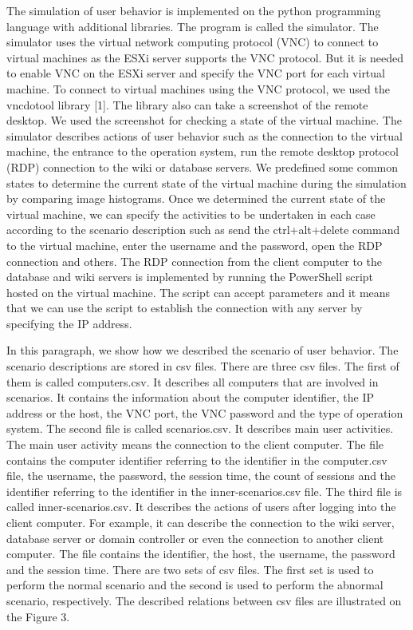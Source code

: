 The simulation of user behavior is implemented on the python programming language with additional libraries. The program is called the simulator. The simulator uses the virtual network computing protocol (VNC) to connect to virtual machines as the ESXi server supports the VNC protocol. But it is needed to enable VNC on the ESXi server and specify the VNC port for each virtual machine. To connect to virtual machines using the VNC protocol, we used the vncdotool library [1]. The library also can take a screenshot of the remote desktop. We used the screenshot for checking a state of the virtual machine. The simulator describes actions of user behavior such as the connection to the virtual machine, the entrance to the operation system, run the remote desktop protocol (RDP) connection to the wiki or database servers. We predefined some common states to determine the current state of the virtual machine during the simulation by comparing image histograms. Once we determined the current state of the virtual machine, we can specify the activities to be undertaken in each case according to the scenario description such as send the ctrl+alt+delete command to the virtual machine, enter the username and the password, open the RDP connection and others. The RDP connection from the client computer to the database and wiki servers is implemented by running the PowerShell script hosted on the virtual machine. The script can accept parameters and it means that we can use the script to establish the connection with any server by specifying the IP address.

In this paragraph, we show how we described the scenario of user behavior. The scenario descriptions are stored in csv files. There are three csv files. The first of them is called computers.csv. It describes all computers that are involved in scenarios. It contains the information about the computer identifier, the IP address or the host, the VNC port, the VNC password and the type of operation system.
The second file is called scenarios.csv. It describes main user activities. The main user activity means the connection to the client computer. The file contains the computer identifier referring to the identifier in the computer.csv file, the username, the password, the session time, the count of sessions and the identifier referring to the identifier in the inner-scenarios.csv file. The third file is called inner-scenarios.csv. It describes the actions of users after logging into the client computer. For example, it can describe the connection to the wiki server, database server or domain controller or even the connection to another client computer. The file contains the identifier, the host, the username, the password and the session time. There are two sets of csv files. The first set is used to perform the normal scenario and the second is used to perform the abnormal scenario, respectively. The described relations between csv files are illustrated on the Figure 3.
 	
